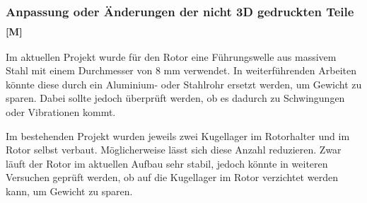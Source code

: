\documentclass[a4paper,12pt]{article}
\begin{document}
\subsubsection{\texorpdfstring{Anpassung oder Änderungen der nicht 3D gedruckten Teile \textsubscript{[M]}}{Anpassung oder Änderungen der nicht 3D gedruckten Teile [M]}}

Im aktuellen Projekt wurde für den Rotor eine Führungswelle aus massivem Stahl mit einem Durchmesser von 8 mm verwendet. In weiterführenden Arbeiten könnte diese durch ein Aluminium- oder Stahlrohr ersetzt werden, um Gewicht zu sparen. Dabei sollte jedoch überprüft werden, ob es dadurch zu Schwingungen oder Vibrationen kommt.\newline

Im bestehenden Projekt wurden jeweils zwei Kugellager im Rotorhalter und im Rotor selbst verbaut. Möglicherweise lässt sich diese Anzahl reduzieren. Zwar läuft der Rotor im aktuellen Aufbau sehr stabil, jedoch könnte in weiteren Versuchen geprüft werden, ob auf die Kugellager im Rotor verzichtet werden kann, um Gewicht zu sparen.

\newpage
\end{document}
